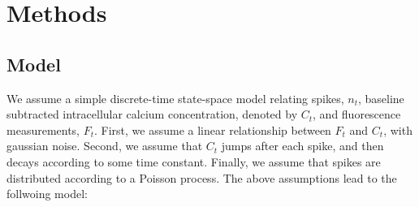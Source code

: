 \documentclass[12pt]{article}
\begin{document}
%
%


\section{Methods} \label{sec:methods}

\subsection{Model}

We assume a simple discrete-time state-space model relating spikes, $n_t$, baseline subtracted intracellular calcium concentration, denoted by $C_t$, and fluorescence measurements, $F_t$.  First, we assume a linear relationship between $F_t$ and $C_t$, with gaussian noise.  Second, we assume that $C_t$ jumps after each spike, and then decays according to some time constant.  Finally, we assume that spikes are distributed according to a Poisson process. The above assumptions lead to the follwoing model:

\end{document}
